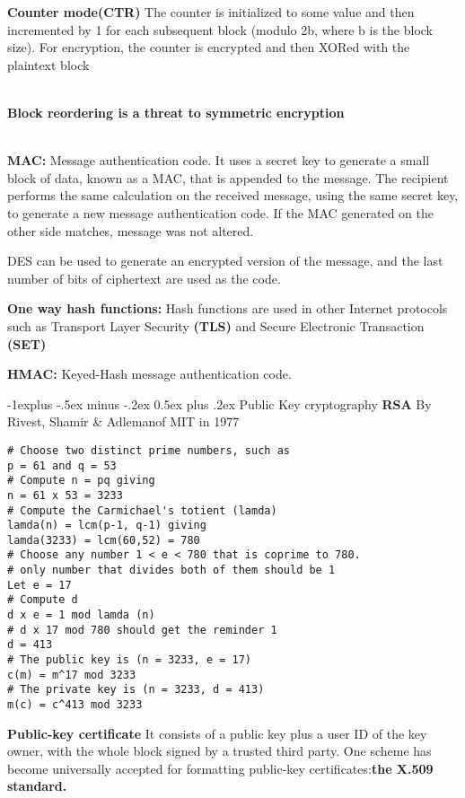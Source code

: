 \documentclass[10pt,landscape]{article}
\makeatletter
\renewcommand{\subsection}{\@startsection{subsection}{2}{0mm}%
    {-1explus -.5ex minus -.2ex}%
    {0.5ex plus .2ex}%
    {\normalfont\normalsize\bfseries}}
\makeatother
\begin{document}
\begin{multicols}{3}
\textbf{Counter mode(CTR)} The counter is initialized to some value and then incremented by 1 for
each subsequent block (modulo 2b, where b is the block size). For encryption, the counter is
encrypted and then XORed with the plaintext block

~\\
\textbf{Block reordering is a threat to symmetric encryption}

~\\

\textbf{MAC:} Message authentication code. It uses a secret key to
generate a small block of data, known as a MAC, that is appended to
the message. The recipient performs the same calculation on the
received message, using the same secret key, to generate a new message
authentication code. If the MAC generated on the other side matches,
message was not altered.

DES can be used to generate an encrypted version of the message, and
the last number of bits of ciphertext are used as the code.

\textbf{One way hash functions:} Hash functions are used in other Internet protocols such as Transport
Layer Security \textbf{(TLS)} and Secure Electronic Transaction \textbf{(SET)}

\textbf{HMAC:} Keyed-Hash message authentication code.

\subsection{Public Key cryptography}
\textbf{RSA} By Rivest, Shamir \& Adlemanof MIT in 1977

\lstset{language=bash,label= ,caption= ,captionpos=b,numbers=none}
\begin{lstlisting}
# Choose two distinct prime numbers, such as
p = 61 and q = 53
# Compute n = pq giving
n = 61 x 53 = 3233
# Compute the Carmichael's totient (lamda)
lamda(n) = lcm(p-1, q-1) giving
lamda(3233) = lcm(60,52) = 780
# Choose any number 1 < e < 780 that is coprime to 780.
# only number that divides both of them should be 1
Let e = 17
# Compute d
d x e = 1 mod lamda (n)
# d x 17 mod 780 should get the reminder 1
d = 413
# The public key is (n = 3233, e = 17)
c(m) = m^17 mod 3233
# The private key is (n = 3233, d = 413)
m(c) = c^413 mod 3233
\end{lstlisting}

\textbf{Public-key certificate} It consists of a public key plus a
user ID of the key owner, with the whole block signed by a trusted
third party.
One scheme has become universally accepted for formatting public-key certificates:\textbf{the X.509 standard.} 


\end{multicols}
\end{document}
